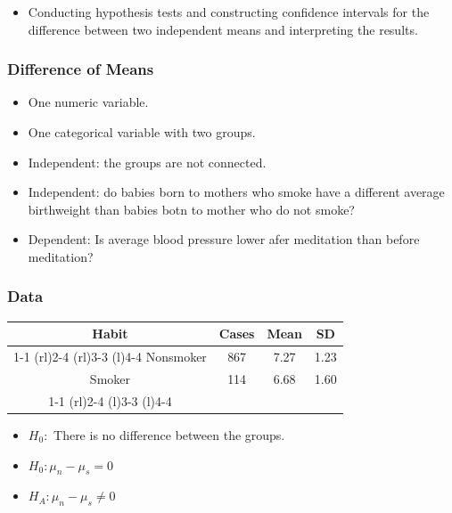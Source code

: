 \documentclass{beamer}
\begin{document}
\begin{frame}
  \begin{itemize}
    \item[] 
      Conducting hypothesis tests and constructing confidence
      intervals for the difference between two independent means and
      interpreting the results.
  \end{itemize}
\end{frame}

\begin{frame}
  \frametitle{Difference of Means}
  \begin{itemize}
    \item[] 
      One numeric variable.
      \vspace{0.5cm}
    \item[] 
      One categorical variable with two groups. 
      \vspace{0.5cm}
    \item[] 
      Independent: the groups are not connected. 
      \vspace{0.5cm}
    \item[] 
      Independent: do babies born to mothers who smoke have a
      different average birthweight than babies botn to mother who do
      not smoke?
      \vspace{0.5cm}
    \item[] 
      Dependent: Is average blood pressure lower afer meditation than
      before meditation?
  \end{itemize}
\end{frame}

\begin{frame}
  \frametitle{Data}
  \centering
  \begin{table}
    \begin{tabular}{@{}cccc@{}}
      Habit & Cases & Mean & SD  \\
      \cmidrule(r){1-1} \cmidrule(rl){2-4} \cmidrule(rl){3-3}
      \cmidrule(l){4-4}
      Nonsmoker & 867 & 7.27 & 1.23 \\
      Smoker & 114 & 6.68 & 1.60 \\ 
      \cmidrule(r){1-1} \cmidrule(rl){2-4} \cmidrule(l){3-3}
      \cmidrule(l){4-4}
    \end{tabular}
  \end{table}
  \begin{itemize}
    \item[] 
      $H_0:$ There is no difference between the groups. 
      \vspace{0.5cm}
    \item[] 
      $H_0: \mu_n - \mu_s = 0$
      \vspace{0.5cm}
    \item[] 
      $H_A: \mu_n - \mu_s \neq 0$
      \vspace{0.5cm}
  \end{itemize}
\end{frame}
\end{document}
